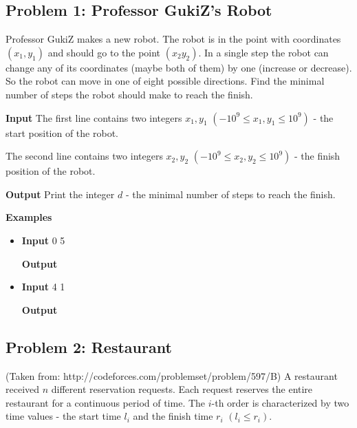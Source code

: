 \normalfont\documentclass[letterpaper,11pt]{article}
\begin{document}
\subsection*{Problem 1: Professor GukiZ's Robot}
Professor GukiZ makes a new robot. The robot is in the point with coordinates $(x_1, y_1)$ and should go to the point $(x_2 y_2)$. In a single step the robot can change any of its coordinates (maybe both of them) by one (increase or decrease). So the robot can move in one of eight possible directions. Find the minimal number of steps the robot should make to reach the finish.

\textbf{Input} \newline
The first line contains two integers $x_1, y_1$ $(-10^9 \leq x_1, y_1 \leq 10^9)$ - the start position of the robot.

The second line contains two integers $x_2, y_2$ $(-10^9 \leq x_2, y_2 \leq 10^9)$ - the finish position of the robot.

\textbf{Output} \newline
Print the integer $d$ - the minimal number of steps to reach the finish.

\textbf{Examples}
\begin{itemize}
\item \textbf{Input}  0  5

\textbf{Output} 

\item \textbf{Input}  4  1

\textbf{Output} 
\end{itemize}

\newpage

\subsection*{Problem 2: Restaurant}

(Taken from: http://codeforces.com/problemset/problem/597/B) \newline
A restaurant received $n$ different reservation requests. Each request reserves the entire restaurant for a continuous period of time. The $i$-th order is characterized by two time values - the start time $l_i$ and the finish time $r_i$ $(l_i \leq r_i)$.
\end{document}
